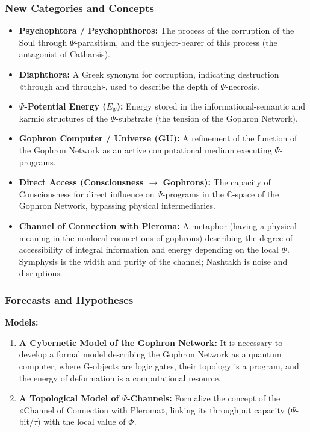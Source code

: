 \documentclass[a4paper,12pt]{article}
\begin{document}
	\subsubsection{New Categories and Concepts}
	
	\begin{itemize}
		\item \textbf{Psychophtora / Psychophthoros:} The process of the corruption of the Soul through $\Psi$-parasitism, and the subject-bearer of this process (the antagonist of Catharsis).
		\item \textbf{Diaphthora:} A Greek synonym for corruption, indicating destruction «through and through», used to describe the depth of $\Psi$-necrosis.
		\item \textbf{$\Psi$-Potential Energy ($E_{\Psi}$):} Energy stored in the informational-semantic and karmic structures of the $\Psi$-substrate (the tension of the Gophron Network).
		\item \textbf{Gophron Computer / Universe (GU):} A refinement of the function of the Gophron Network as an active computational medium executing $\Psi$-programs.
		\item \textbf{Direct Access (Consciousness $\to$ Gophrons):} The capacity of Consciousness for direct influence on $\Psi$-programs in the $\mathbb{C}$-space of the Gophron Network, bypassing physical intermediaries.
		\item \textbf{Channel of Connection with Pleroma:} A metaphor (having a physical meaning in the nonlocal connections of gophrons) describing the degree of accessibility of integral information and energy depending on the local $\Phi$. Symphysis is the width and purity of the channel; Nashtakh is noise and disruptions.
	\end{itemize}
	
	\subsubsection{Forecasts and Hypotheses}
	
	\textbf{Models:}
	\begin{enumerate}
		\item \textbf{A Cybernetic Model of the Gophron Network:} It is necessary to develop a formal model describing the Gophron Network as a quantum computer, where G-objects are logic gates, their topology is a program, and the energy of deformation is a computational resource.
		\item \textbf{A Topological Model of $\Psi$-Channels:} Formalize the concept of the «Channel of Connection with Pleroma», linking its throughput capacity ($\Psi$-bit/$\tau$) with the local value of $\Phi$.
	\end{enumerate}
	
\end{document}
